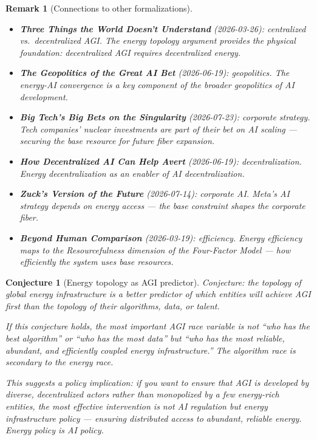 \documentclass[11pt,a4paper]{article}
\newtheorem{remark}[definition]{Remark}
\newtheorem{conjecture}[definition]{Conjecture}
\begin{document}
\begin{remark}[Connections to other formalizations]
\begin{itemize}
\item \textbf{Three Things the World Doesn't Understand} (2026-03-26):
  centralized vs.\ decentralized AGI. The energy topology argument
  provides the physical foundation: decentralized AGI requires
  decentralized energy.
\item \textbf{The Geopolitics of the Great AI Bet} (2026-06-19):
  geopolitics. The energy-AI convergence is a key component of the
  broader geopolitics of AI development.
\item \textbf{Big Tech's Big Bets on the Singularity} (2026-07-23):
  corporate strategy. Tech companies' nuclear investments are part of
  their bet on AI scaling --- securing the base resource for future
  fiber expansion.
\item \textbf{How Decentralized AI Can Help Avert} (2026-06-19):
  decentralization. Energy decentralization as an enabler of AI
  decentralization.
\item \textbf{Zuck's Version of the Future} (2026-07-14): corporate AI.
  Meta's AI strategy depends on energy access --- the base constraint
  shapes the corporate fiber.
\item \textbf{Beyond Human Comparison} (2026-03-19): efficiency.
  Energy efficiency maps to the Resourcefulness dimension of the
  Four-Factor Model --- how efficiently the system uses base resources.
\end{itemize}
\end{remark}

\begin{conjecture}[Energy topology as AGI predictor]
Conjecture: the topology of global energy infrastructure is a better
predictor of which entities will achieve AGI first than the topology of
their algorithms, data, or talent.

If this conjecture holds, the most important AGI race variable is not
``who has the best algorithm'' or ``who has the most data'' but ``who
has the most reliable, abundant, and efficiently coupled energy
infrastructure.'' The algorithm race is secondary to the energy race.

This suggests a policy implication: if you want to ensure that AGI is
developed by diverse, decentralized actors rather than monopolized by
a few energy-rich entities, the most effective intervention is not
AI regulation but energy infrastructure policy --- ensuring distributed
access to abundant, reliable energy. Energy policy is AI policy.
\end{conjecture}
\end{document}
